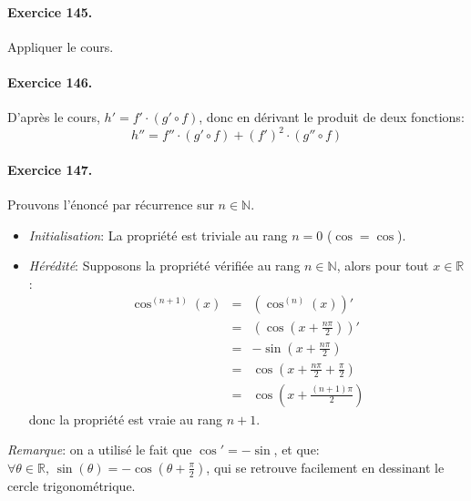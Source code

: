 \paragraph{Exercice 145.} Appliquer le cours.

\paragraph{Exercice 146.} D’après le cours, $h'=f' \cdot (g' \circ f)$, donc en dérivant le produit de deux fonctions:
\[
h''=f''\cdot (g' \circ f) + (f')^2 \cdot (g'' \circ f) 
\]

\paragraph{Exercice 147.} Prouvons l’énoncé par récurrence sur $n\in\mathbb{N}$.
\begin{itemize} 
\item \textit{Initialisation}: La propriété est triviale au rang $n=0$ ($\cos=\cos$).\\
\item \textit{Hérédité}: Supposons la propriété vérifiée au rang $n\in\mathbb{N}$, alors pour tout $ x \in \mathbb{R}$:
\begin{eqnarray}
 \cos^{(n+1)}(x) &=& \left(\cos^{(n)}(x)\right)' \nonumber \\
  &=&  \left(\cos \left( x+\frac{n\pi}{2} \right) \right)' \nonumber \\
  &=&  -\sin \left( x+\frac{n\pi}{2} \right) \nonumber \\
  &=&  \cos \left( x+\frac{n\pi}{2} +\frac{\pi}{2}\right) \nonumber \\
  &=&  \cos \left( x+\frac{(n+1)\pi}{2}\right) \nonumber 
\end{eqnarray}
donc la propriété est vraie au rang $n+1$.
\end{itemize}
\textit{Remarque}: on a utilisé le fait que $\cos'=-\sin$, et que: $\forall \theta\in\mathbb{R}, \, \sin(\theta)=-\cos \left(\theta+\frac{\pi}{2}\right)$, qui se retrouve facilement en dessinant le cercle trigonométrique.

